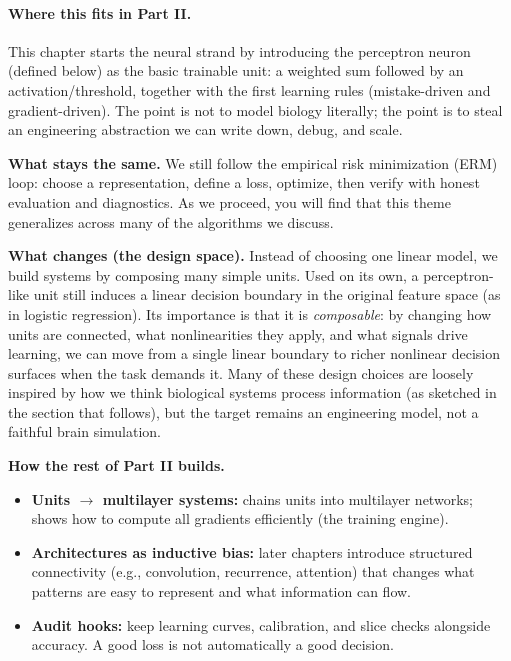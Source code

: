 \paragraph{Where this fits in Part II.}\label{sec:perceptron_outline_of_neural_network_study}
This chapter starts the neural strand by introducing the perceptron neuron (defined below) as the basic
trainable unit: a weighted sum followed by an activation/threshold, together with the first learning rules
(mistake-driven and gradient-driven). The point is not to model biology literally; the point is to steal an
engineering abstraction we can write down, debug, and scale.

\begin{tcolorbox}[summarybox, title={Part II local roadmap: what stays the same, what changes}]
\textbf{What stays the same.} We still follow the empirical risk minimization (ERM) loop: choose a representation, define a loss, optimize, then verify with honest evaluation and diagnostics. As we proceed, you will find that this theme generalizes across many of the algorithms we discuss.

\medskip
\textbf{What changes (the design space).} Instead of choosing one linear model, we build systems by composing
many simple units. Used on its own, a perceptron-like unit still induces a linear decision boundary in the
original feature space (as in logistic regression). Its importance is that it is \emph{composable}: by changing
how units are connected, what nonlinearities they apply, and what signals drive learning, we can move from a
single linear boundary to richer nonlinear decision surfaces when the task demands it. Many of these design
choices are loosely inspired by how we think biological systems process information (as sketched in the
section that follows), but the target remains an engineering model, not a faithful brain simulation.

\medskip
\textbf{How the rest of Part II builds.}
\begin{itemize}
  \item \textbf{Units \(\rightarrow\) multilayer systems:}  chains units into multilayer networks;
   shows how to compute all gradients efficiently (the training engine).
  \item \textbf{Architectures as inductive bias:} later chapters introduce structured connectivity (e.g., convolution,
  recurrence, attention) that changes what patterns are easy to represent and what information can flow.
  \item \textbf{Audit hooks:} keep learning curves, calibration, and slice checks alongside accuracy. A good loss is
  not automatically a good decision.
\end{itemize}
\end{tcolorbox}


